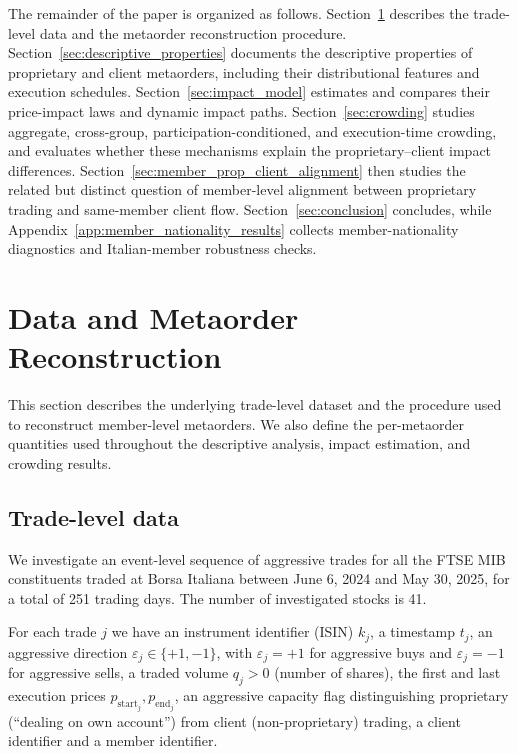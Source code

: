 \documentclass[11pt]{article}
\begin{document}
The remainder of the paper is organized as follows. Section~\ref{sec:data_metaorders} describes the trade-level data and the metaorder reconstruction procedure. Section~\ref{sec:descriptive_properties} documents the descriptive properties of proprietary and client metaorders, including their distributional features and execution schedules. Section~\ref{sec:impact_model} estimates and compares their price-impact laws and dynamic impact paths. Section~\ref{sec:crowding} studies aggregate, cross-group, participation-conditioned, and execution-time crowding, and evaluates whether these mechanisms explain the proprietary--client impact differences. Section~\ref{sec:member_prop_client_alignment} then studies the related but distinct question of member-level alignment between proprietary trading and same-member client flow. Section~\ref{sec:conclusion} concludes, while Appendix~\ref{app:member_nationality_results} collects member-nationality diagnostics and Italian-member robustness checks.

\section{Data and Metaorder Reconstruction}
\label{sec:data_metaorders}

This section describes the underlying trade-level dataset and the procedure used to reconstruct member-level metaorders.
We also define the per-metaorder quantities used throughout the descriptive analysis, impact estimation, and crowding results.

\subsection{Trade-level data}

We investigate an event-level sequence of aggressive trades for all the FTSE MIB constituents traded at Borsa Italiana
between June 6, 2024 and May 30, 2025, for a total of 251 trading days. The number of investigated stocks is 41.

For each trade $j$ we have an instrument identifier (ISIN) $k_j$, a timestamp $t_j$, an aggressive
direction $\varepsilon_j \in \{+1,-1\}$, with $\varepsilon_j = +1$ for aggressive buys and $\varepsilon_j=-1$ 
for aggressive sells, a traded volume $q_j > 0$ (number of shares), the first and last execution 
prices $p_{\mathrm{start}_j}, p_{\mathrm{end}_j}$, an aggressive capacity flag distinguishing proprietary 
(``dealing on own account'') from client (non-proprietary) trading, a client identifier and a member identifier. 
\end{document}
